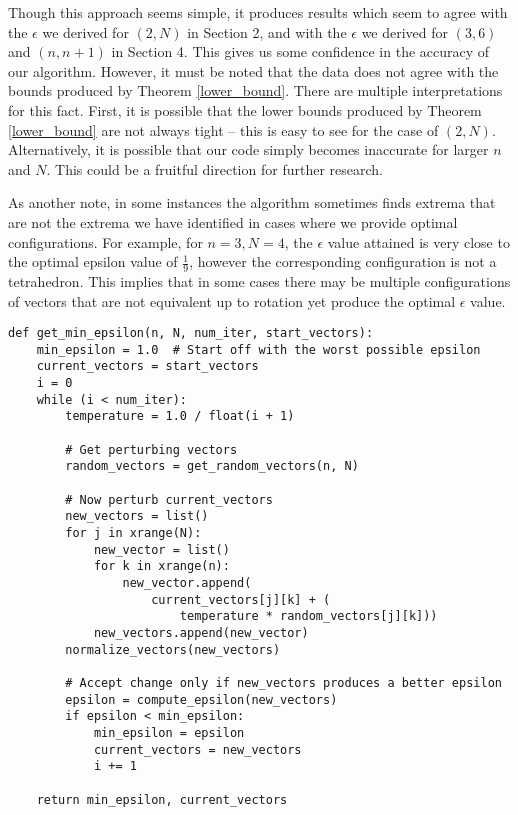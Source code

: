 \documentclass[11pt,letterpaper,twoside,english]{article}
\theoremstyle{theorem}
\theoremstyle{remark}
\begin{document}
Though this approach seems simple, it produces  results which seem to agree with the $\epsilon$ we derived for $(2, N)$ in Section 2, and with the $\epsilon$ we derived for $(3, 6)$ and $(n, n+1)$ in Section 4. This gives us some confidence in the accuracy of our algorithm. However, it must be noted that the data does not agree with the bounds produced by Theorem \ref{lower_bound}. There are multiple interpretations for this fact. First, it is possible that the lower bounds produced by Theorem \ref{lower_bound} are not always tight -- this is easy to see for the case of $(2, N)$. Alternatively, it is possible that our code simply becomes inaccurate for larger $n$ and $N$. This could be a fruitful direction for further research.

As another note, in some instances the algorithm sometimes finds extrema that are not the extrema we have identified in cases where we provide optimal configurations. For example, for $n=3,N=4$, the $\epsilon$ value attained is very close to the optimal epsilon value of $\frac{1}{9}$, however the corresponding configuration is not a tetrahedron. This implies that in some cases there may be multiple configurations of vectors that are not equivalent up to rotation yet produce the optimal $\epsilon$ value. 

\begin{lstlisting}
def get_min_epsilon(n, N, num_iter, start_vectors):
    min_epsilon = 1.0  # Start off with the worst possible epsilon
    current_vectors = start_vectors
    i = 0
    while (i < num_iter):
        temperature = 1.0 / float(i + 1)

        # Get perturbing vectors
        random_vectors = get_random_vectors(n, N)

        # Now perturb current_vectors
        new_vectors = list()
        for j in xrange(N):
            new_vector = list()
            for k in xrange(n):
                new_vector.append(
                    current_vectors[j][k] + (
                        temperature * random_vectors[j][k]))
            new_vectors.append(new_vector)
        normalize_vectors(new_vectors)
        
        # Accept change only if new_vectors produces a better epsilon
        epsilon = compute_epsilon(new_vectors)
        if epsilon < min_epsilon:
            min_epsilon = epsilon
            current_vectors = new_vectors
            i += 1

    return min_epsilon, current_vectors
\end{lstlisting}
\end{document}
